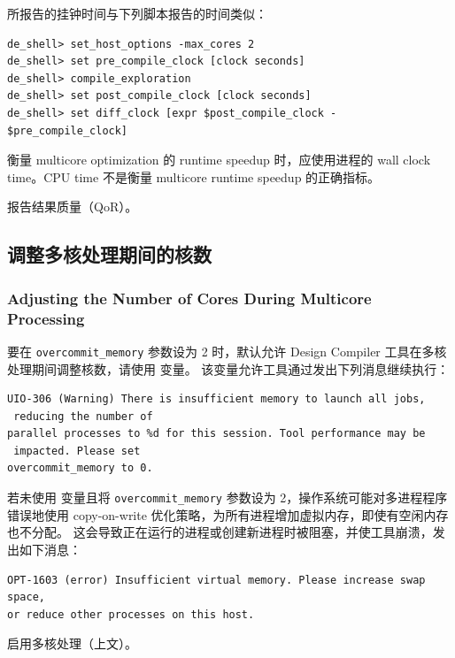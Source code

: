 所报告的挂钟时间与下列脚本报告的时间类似：
\begin{lstlisting}
de_shell> set_host_options -max_cores 2
de_shell> set pre_compile_clock [clock seconds]
de_shell> compile_exploration
de_shell> set post_compile_clock [clock seconds]
de_shell> set diff_clock [expr $post_compile_clock - $pre_compile_clock]
\end{lstlisting}

衡量 multicore optimization 的 runtime speedup 时，应使用进程的 wall clock time。CPU time 不是衡量 multicore runtime speedup 的正确指标。

\begin{seeAlsoBox}
报告结果质量（QoR）。
\end{seeAlsoBox}

\subsection{调整多核处理期间的核数}
\subsubsection*{Adjusting the Number of Cores During Multicore Processing}

要在 \texttt{overcommit\_memory} 参数设为 2 时，默认允许 Design Compiler 工具在多核处理期间调整核数，请使用  变量。
该变量允许工具通过发出下列消息继续执行：
\begin{lstlisting}
UIO-306 (Warning) There is insufficient memory to launch all jobs,
 reducing the number of
parallel processes to %d for this session. Tool performance may be
 impacted. Please set
overcommit_memory to 0.
\end{lstlisting}

若未使用  变量且将 \texttt{overcommit\_memory} 参数设为 2，操作系统可能对多进程程序错误地使用 copy-on-write 优化策略，为所有进程增加虚拟内存，即使有空闲内存也不分配。
这会导致正在运行的进程或创建新进程时被阻塞，并使工具崩溃，发出如下消息：
\begin{lstlisting}
OPT-1603 (error) Insufficient virtual memory. Please increase swap space,
or reduce other processes on this host.
\end{lstlisting}

\begin{seeAlsoBox}
启用多核处理（上文）。
\end{seeAlsoBox}

